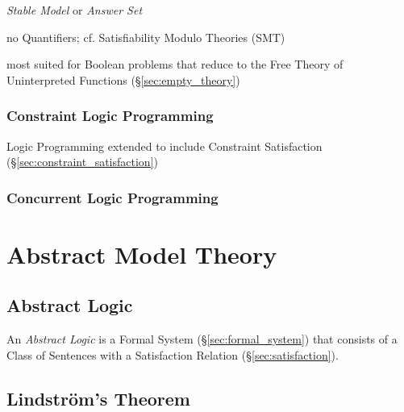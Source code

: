 \emph{Stable Model} or \emph{Answer Set}

no Quantifiers; cf. Satisfiability Modulo Theories (SMT)

most suited for Boolean problems that reduce to the Free Theory of
Uninterpreted Functions (\S\ref{sec:empty_theory})



\subsubsection{Constraint Logic Programming}
\label{sec:constraint_logic_programming}

Logic Programming extended to include Constraint Satisfaction
(\S\ref{sec:constraint_satisfaction})



\subsubsection{Concurrent Logic Programming}
\label{sec:concurrent_logic_programming}



\section{Abstract Model Theory}\label{sec:abstract_model}

\subsection{Abstract Logic}\label{sec:abstract_logic}

An \emph{Abstract Logic} is a Formal System
(\S\ref{sec:formal_system}) that consists of a Class of Sentences with
a Satisfaction Relation (\S\ref{sec:satisfaction}).



\subsection{Lindstr\"om's Theorem}\label{sec:lindstroms_theorem}

